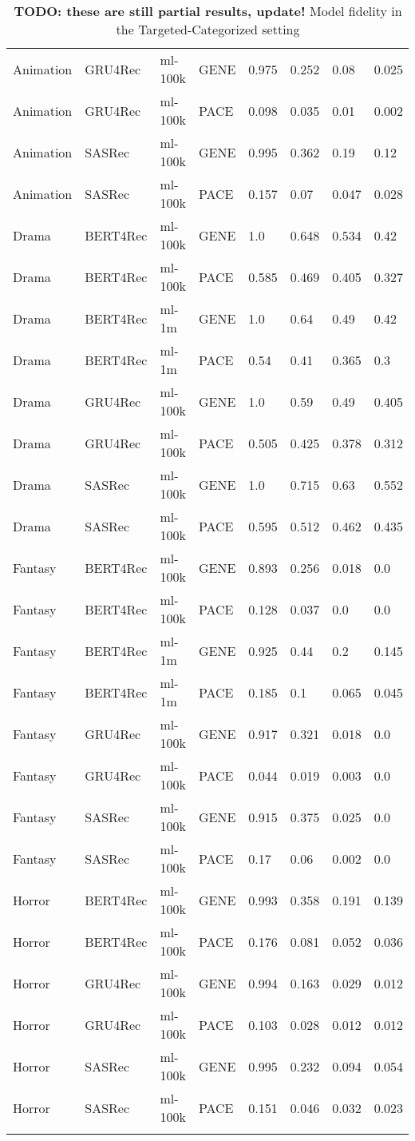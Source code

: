 \begin{longtable}{|l|l|l|l|l|l|l|l|}
Animation & GRU4Rec & ml-100k & GENE & 0.975 & 0.252 & 0.08 & 0.025 \\
Animation & GRU4Rec & ml-100k & PACE & 0.098 & 0.035 & 0.01 & 0.002 \\\hline
Animation & SASRec & ml-100k & GENE & 0.995 & 0.362 & 0.19 & 0.12 \\
Animation & SASRec & ml-100k & PACE & 0.157 & 0.07 & 0.047 & 0.028 \\\hline
Drama & BERT4Rec & ml-100k & GENE & 1.0 & 0.648 & 0.534 & 0.42 \\
Drama & BERT4Rec & ml-100k & PACE & 0.585 & 0.469 & 0.405 & 0.327 \\\hline
Drama & BERT4Rec & ml-1m & GENE & 1.0 & 0.64 & 0.49 & 0.42 \\
Drama & BERT4Rec & ml-1m & PACE & 0.54 & 0.41 & 0.365 & 0.3 \\\hline
Drama & GRU4Rec & ml-100k & GENE & 1.0 & 0.59 & 0.49 & 0.405 \\
Drama & GRU4Rec & ml-100k & PACE & 0.505 & 0.425 & 0.378 & 0.312 \\\hline
Drama & SASRec & ml-100k & GENE & 1.0 & 0.715 & 0.63 & 0.552 \\
Drama & SASRec & ml-100k & PACE & 0.595 & 0.512 & 0.462 & 0.435 \\\hline
Fantasy & BERT4Rec & ml-100k & GENE & 0.893 & 0.256 & 0.018 & 0.0 \\
Fantasy & BERT4Rec & ml-100k & PACE & 0.128 & 0.037 & 0.0 & 0.0 \\\hline
Fantasy & BERT4Rec & ml-1m & GENE & 0.925 & 0.44 & 0.2 & 0.145 \\
Fantasy & BERT4Rec & ml-1m & PACE & 0.185 & 0.1 & 0.065 & 0.045 \\\hline
Fantasy & GRU4Rec & ml-100k & GENE & 0.917 & 0.321 & 0.018 & 0.0 \\
Fantasy & GRU4Rec & ml-100k & PACE & 0.044 & 0.019 & 0.003 & 0.0 \\\hline
Fantasy & SASRec & ml-100k & GENE & 0.915 & 0.375 & 0.025 & 0.0 \\
Fantasy & SASRec & ml-100k & PACE & 0.17 & 0.06 & 0.002 & 0.0 \\\hline
Horror & BERT4Rec & ml-100k & GENE & 0.993 & 0.358 & 0.191 & 0.139 \\
Horror & BERT4Rec & ml-100k & PACE & 0.176 & 0.081 & 0.052 & 0.036 \\\hline
Horror & GRU4Rec & ml-100k & GENE & 0.994 & 0.163 & 0.029 & 0.012 \\
Horror & GRU4Rec & ml-100k & PACE & 0.103 & 0.028 & 0.012 & 0.012 \\\hline
Horror & SASRec & ml-100k & GENE & 0.995 & 0.232 & 0.094 & 0.054 \\
Horror & SASRec & ml-100k & PACE & 0.151 & 0.046 & 0.032 & 0.023 \\\hline
\caption{\textbf{TODO: these are still partial results, update!} Model fidelity in the Targeted-Categorized setting}
    \label{tab:eval_targ_cat}
    \end{longtable}
    \endgroup